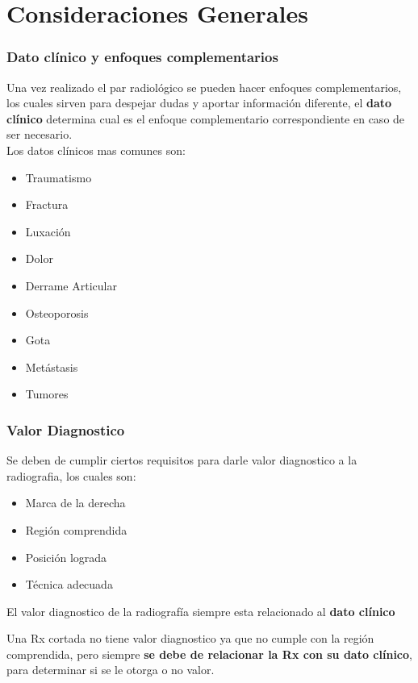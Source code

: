 \chapter{Consideraciones Generales}

\subsection*{Dato clínico y enfoques complementarios}

Una vez realizado el par radiológico se pueden hacer enfoques complementarios, los cuales sirven para despejar dudas y aportar información diferente, el \textbf{dato clínico} determina cual es el enfoque complementario correspondiente en caso de ser necesario.\\

Los datos clínicos mas comunes son:
\begin{itemize}
    \item Traumatismo
    \item Fractura
    \item Luxación
    \item Dolor
    \item Derrame Articular
    \item Osteoporosis
    \item Gota
    \item Metástasis
    \item Tumores\\
\end{itemize}


\subsection*{Valor Diagnostico}
Se deben de cumplir ciertos requisitos para darle valor diagnostico a la radiografia, los cuales son:\\
\begin{itemize}
    \item Marca de la derecha
    \item Región comprendida
    \item Posición lograda
    \item Técnica adecuada\\
\end{itemize}

El valor diagnostico de la radiografía siempre esta relacionado al \textbf{dato clínico} \\

\begin{tcolorbox}[colback=red!10, colframe=red, title=Importante]
Una Rx cortada no tiene valor diagnostico ya que no cumple con la región comprendida, pero siempre \textbf{se debe de relacionar la Rx con su dato clínico}, para determinar si se le otorga o no valor.
\end{tcolorbox}

